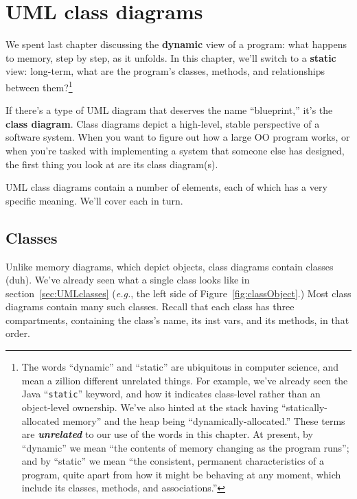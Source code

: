 
\chapter{UML class diagrams}
\label{ch:classDiags}

We spent last chapter discussing the \textbf{dynamic} view of a program: what
happens to memory, step by step, as it unfolds. In this chapter, we'll switch
to a \textbf{static} view: long-term, what are the program's classes, methods,
and relationships between them?\footnote{The words ``dynamic'' and ``static''
are ubiquitous in computer science, and mean a zillion different unrelated
things. For example, we've already seen the Java ``\texttt{static}'' keyword,
and how it indicates class-level rather than an object-level ownership. We've
also hinted at the stack having ``statically-allocated memory'' and the heap
being ``dynamically-allocated.'' These terms are \textbf{\textit{unrelated}} to
our use of the words in this chapter. At present, by ``dynamic'' we mean ``the
contents of memory changing as the program runs''; and by ``static'' we mean
``the consistent, permanent characteristics of a program, quite apart from how
it might be behaving at any moment, which include its classes, methods, and
associations.''}

If there's a type of UML diagram that deserves the name ``blueprint,'' it's the
\textbf{class diagram}. Class diagrams depict a high-level, stable perspective
of a software system. When you want to figure out how a large OO program
works, or when you're tasked with implementing a system that someone else has
designed, the first thing you look at are its class diagram(s).

UML class diagrams contain a number of elements, each of which has a very
specific meaning. We'll cover each in turn.

\section{Classes}

Unlike memory diagrams, which depict objects, class diagrams contain classes
(duh). We've already seen what a single class looks like in
section~\ref{sec:UMLclasses} (\textit{e.g.}, the left side of
Figure~\ref{fig:classObject}.) Most class diagrams contain many such classes.
Recall that each class has three compartments, containing the class's name,
its inst vars, and its methods, in that order.

